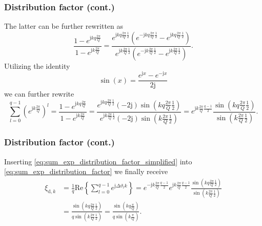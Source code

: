\begin{frame}
	\frametitle{Distribution factor  (cont.)}
    The latter can be further rewritten as
    $$
    \frac{1-e^{\mathrm{j} k q \frac{2\pi}{Q}}}{1-e^{\mathrm{j} k \frac{2\pi}{Q}}} = \frac{e^{\mathrm{j} k q \frac{2\pi}{Q}\frac{1}{2}}\left(e^{-\mathrm{j} k q \frac{2\pi}{Q}\frac{1}{2}}-e^{\mathrm{j} k q \frac{2\pi}{Q}\frac{1}{2}}\right)}{e^{\mathrm{j} k \frac{2\pi}{Q}\frac{1}{2}}\left(e^{-\mathrm{j} k \frac{2\pi}{Q}\frac{1}{2}}-e^{\mathrm{j} k \frac{2\pi}{Q}\frac{1}{2}}\right)}.
    $$
    Utilizing the identity
    $$
    \sin(x) = \frac{e^{\mathrm{j} x}-e^{-\mathrm{j} x}}{2\mathrm{j}}
    $$
    we can further rewrite
    \begin{equation}
        \sum_{l=0}^{q-1} \left(e^{\mathrm{j} k  \frac{2\pi}{Q}}\right)^l =\frac{1-e^{\mathrm{j} k q \frac{2\pi}{Q}}}{1-e^{\mathrm{j} k \frac{2\pi}{Q}}} = \frac{e^{\mathrm{j} k q \frac{2\pi}{Q}\frac{1}{2}}(-2\mathrm{j})\sin(k q \frac{2\pi}{Q}\frac{1}{2})}{e^{\mathrm{j} k \frac{2\pi}{Q}\frac{1}{2}}(-2\mathrm{j})\sin(k \frac{2\pi}{Q}\frac{1}{2})}=e^{\mathrm{j}k\frac{2 \pi}{Q}\frac{q-1}{2}}\frac{\sin(k q \frac{2\pi}{Q}\frac{1}{2})}{\sin(k \frac{2\pi}{Q}\frac{1}{2})}.
        \label{eq:sum_exp_distribution_factor_simplified}
    \end{equation}
\end{frame}

\begin{frame}
	\frametitle{Distribution factor  (cont.)}
    Inserting \eqref{eq:sum_exp_distribution_factor_simplified} into \eqref{eq:sum_exp_distribution_factor} we finally receive
    \begin{equation}
        \begin{split}
        \xi_{\mathrm{d},k} &= \frac{1}{q}\mathrm{Re}\left\{\sum_{l=0}^{q-1} e^{\mathrm{j} \Delta\vartheta_l k}\right\} = e^{- \mathrm{j} k \frac{2\pi}{Q} \frac{q-1}{2} } e^{\mathrm{j}k\frac{2 \pi}{Q}\frac{q-1}{2}}\frac{\sin(k q \frac{2\pi}{Q}\frac{1}{2})}{\sin(k \frac{2\pi}{Q}\frac{1}{2})}\\
            &= \frac{\sin(k q \frac{2\pi}{Q}\frac{1}{2})}{q\sin(k \frac{2\pi}{Q}\frac{1}{2})} = \frac{\sin(k q \frac{\pi}{Q})}{q\sin(k \frac{\pi}{Q})}.
    \end{split}
    \end{equation}
\end{frame}